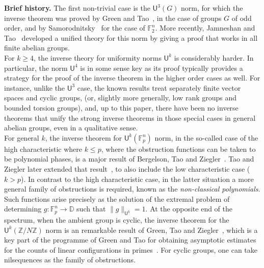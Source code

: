 \documentclass[a4paper,11pt]{article}
\numberwithin{theorem}{section}
\theoremstyle{definition}
\begin{document}
\noindent\textbf{Brief history.} The first non-trivial case is the $\mathsf{U}^3(G)$ norm, for which the inverse theorem was proved by Green and Tao~\cite{GreenTaoU3}, in the case of groups $G$ of odd order, and by Samorodnitsky~\cite{SamorU3} for the case of $\mathbb{F}_2^{n}$. More recently, Jamneshan and Tao~\cite{JamTao} developed a unified theory for this norm by giving a proof that works in all finite abelian groups.\\
\indent For $k \geq 4$, the inverse theory for uniformity norms $\mathsf{U}^k$ is considerably harder. In particular, the norm $\mathsf{U}^4$ is in some sense key as its proof typically provides a strategy for the proof of the inverse theorem in the higher order cases as well. For instance, unlike the $\mathsf{U}^3$ case, the known results treat separately finite vector spaces and cyclic groups, (or, slightly more generally, low rank groups and bounded torsion groups), and, up to this paper, there have been no inverse theorems that unify the strong inverse theorems in those special cases in general abelian groups, even in a qualitative sense.\\
\indent For general $k$, the inverse theorem for $\mathsf{U}^k(\mathbb{F}_p^n)$ norm, in the so-called case of the high characteristic where $k \leq p$, where the obstruction functions can be taken to be polynomial phases, is a major result of Bergelson, Tao and Ziegler~\cite{BTZ, TaoZieglerCorr}. Tao and Ziegler later extended that result~\cite{TaoZiegler}, to also include the low characteristic case ($k > p$). In contrast to the high characteristic case, in the latter situation a more general family of obstructions is required, known as the \textit{non-classical polynomials}. Such functions arise precisely as the solution of the extremal problem of determining $g : \mathbb{F}_p^n \to \mathbb{D}$ such that $\|g\|_{\mathsf{U}^k} = 1$. At the opposite end of the spectrum, when the ambient group is cyclic, the inverse theorem for the $\mathsf{U}^k(\mathbb{Z}/N\mathbb{Z})$ norm is an remarkable result of Green, Tao and Ziegler~\cite{GTZU4, GTZ}, which is a key part of the programme of Green and Tao for obtaining asymptotic estimates for the counts of linear configurations in primes~\cite{GTprimes1, GTprimes2}. For cyclic groups, one can take nilsequences as the family of obstructions.\\
\end{document}
